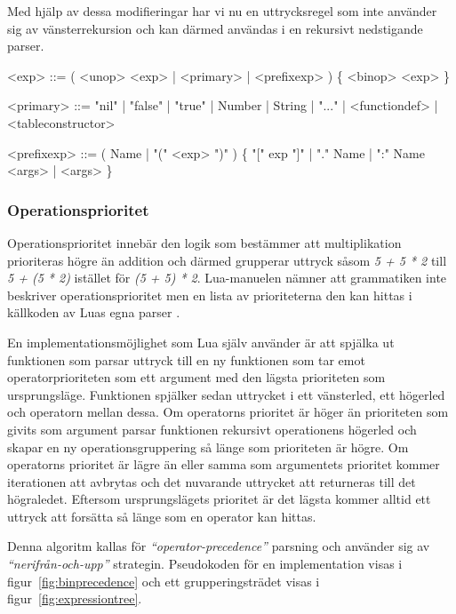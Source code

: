 Med hjälp av dessa modifieringar har vi nu en uttrycksregel som inte använder
sig av vänsterrekursion och kan därmed användas i en rekursivt nedstigande
parser.

\setlength{\grammarindent}{6em}
\begin{grammar}
  \singlespace\small%
  \selectfont
  <exp> ::= ( <unop> <exp> | <primary> | <prefixexp> ) \{ <binop> <exp> \}

  <primary> ::= "nil" | "false" | "true" | Number | String | "..." |
      <functiondef> | <tableconstructor>

  <prefixexp> ::= ( Name | "(" <exp> ")" ) \{ "[" exp "]" | "." Name |
      ":" Name <args> | <args> \}
\end{grammar}

\subsubsection{Operationsprioritet}

Operationsprioritet innebär den logik som bestämmer att multiplikation
prioriteras högre än addition och därmed grupperar uttryck såsom \textit{5 + 5
* 2} till \textit{5 + (5 * 2)} istället för \textit{(5 + 5) * 2}. Lua-manuelen
nämner att grammatiken inte beskriver operationsprioritet \citep{luaref} men
en lista av prioriteterna den kan hittas i källkoden av Luas egna parser
\citep{lparse}.

En implementationsmöjlighet som Lua själv använder är att spjälka ut
funktionen som parsar uttryck till en ny funktionen som tar emot
operatorprioriteten som ett argument med den lägsta prioriteten som
ursprungsläge. Funktionen spjälker sedan uttrycket i ett vänsterled, ett
högerled och operatorn mellan dessa. Om operatorns prioritet är höger än
prioriteten som givits som argument parsar funktionen rekursivt operationens
högerled och skapar en ny operationsgruppering så länge som prioriteten är
högre. Om operatorns prioritet är lägre än eller samma som argumentets
prioritet kommer iterationen att avbrytas och det nuvarande uttrycket att
returneras till det högraledet. Eftersom ursprungslägets prioritet är det
lägsta kommer alltid ett uttryck att forsätta så länge som en operator kan
hittas.

Denna algoritm kallas för \textit{``operator-precedence''} parsning och
använder sig av \textit{``nerifrån-och-upp''} strategin. Pseudokoden för en
implementation visas i figur~\ref{fig:binprecedence} och ett grupperingsträdet
visas i figur~\ref{fig:expressiontree}.

